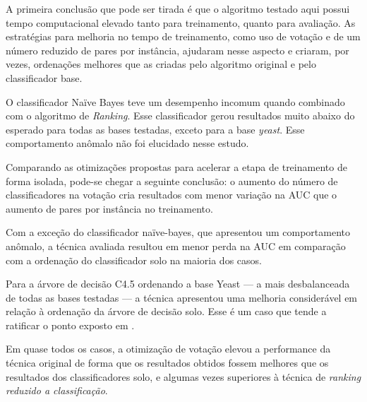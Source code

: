 A primeira conclusão que pode ser tirada é que o algoritmo testado aqui possui tempo computacional elevado tanto para treinamento, quanto para avaliação. As estratégias para melhoria no tempo de treinamento, como uso de votação e de um número reduzido de pares por instância, ajudaram nesse aspecto e criaram, por vezes, ordenações melhores que as criadas pelo algoritmo original e pelo classificador base.

O classificador Naïve Bayes teve um desempenho incomum quando combinado com o algoritmo de \emph{Ranking}. Esse classificador gerou resultados muito abaixo do esperado para todas as bases testadas, exceto para a base \emph{yeast}. Esse comportamento anômalo não foi elucidado nesse estudo.

Comparando as otimizações propostas para acelerar a etapa de treinamento de forma isolada, pode-se chegar a seguinte conclusão: o aumento do número de classificadores na votação cria resultados com menor variação na AUC que o aumento de pares por instância no treinamento.

Com a exceção do classificador naïve-bayes, que apresentou um comportamento anômalo, a técnica avaliada resultou em menor perda na AUC em comparação com a ordenação do classificador solo na maioria dos casos.

Para a árvore de decisão C4.5 ordenando a base Yeast --- a mais desbalanceada de todas as bases testadas --- a técnica apresentou uma melhoria considerável em relação à ordenação da árvore de decisão solo. Esse é um caso que tende a ratificar o ponto exposto em \cite{langford08}.

Em quase todos os casos, a otimização de votação elevou a performance da técnica original de forma que os resultados obtidos fossem melhores que os resultados dos classificadores solo, e algumas vezes superiores à técnica de \emph{ranking reduzido a classificação}.
